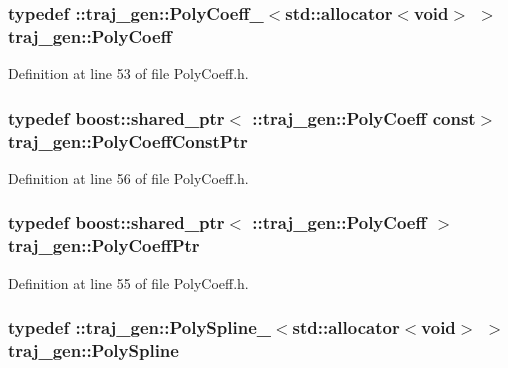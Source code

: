 \subsubsection[{\texorpdfstring{Poly\+Coeff}{PolyCoeff}}]{\setlength{\rightskip}{0pt plus 5cm}typedef \+::{\bf traj\+\_\+gen\+::\+Poly\+Coeff\+\_\+}$<$std\+::allocator$<$void$>$ $>$ {\bf traj\+\_\+gen\+::\+Poly\+Coeff}}\hypertarget{namespacetraj__gen_a8886e1ed8c6d0913ea4e2ef5e9994268}{}\label{namespacetraj__gen_a8886e1ed8c6d0913ea4e2ef5e9994268}


Definition at line 53 of file Poly\+Coeff.\+h.

\subsubsection[{\texorpdfstring{Poly\+Coeff\+Const\+Ptr}{PolyCoeffConstPtr}}]{\setlength{\rightskip}{0pt plus 5cm}typedef boost\+::shared\+\_\+ptr$<$ \+::{\bf traj\+\_\+gen\+::\+Poly\+Coeff} const$>$ {\bf traj\+\_\+gen\+::\+Poly\+Coeff\+Const\+Ptr}}\hypertarget{namespacetraj__gen_aa946fcad3e6649940054ef996b4f8fb6}{}\label{namespacetraj__gen_aa946fcad3e6649940054ef996b4f8fb6}


Definition at line 56 of file Poly\+Coeff.\+h.

\subsubsection[{\texorpdfstring{Poly\+Coeff\+Ptr}{PolyCoeffPtr}}]{\setlength{\rightskip}{0pt plus 5cm}typedef boost\+::shared\+\_\+ptr$<$ \+::{\bf traj\+\_\+gen\+::\+Poly\+Coeff} $>$ {\bf traj\+\_\+gen\+::\+Poly\+Coeff\+Ptr}}\hypertarget{namespacetraj__gen_a7dee4033e88ce14f00e980b1cb481921}{}\label{namespacetraj__gen_a7dee4033e88ce14f00e980b1cb481921}


Definition at line 55 of file Poly\+Coeff.\+h.

\subsubsection[{\texorpdfstring{Poly\+Spline}{PolySpline}}]{\setlength{\rightskip}{0pt plus 5cm}typedef \+::{\bf traj\+\_\+gen\+::\+Poly\+Spline\+\_\+}$<$std\+::allocator$<$void$>$ $>$ {\bf traj\+\_\+gen\+::\+Poly\+Spline}}\hypertarget{namespacetraj__gen_a4cc870f21a33c36c743805af48140ae8}{}\label{namespacetraj__gen_a4cc870f21a33c36c743805af48140ae8}


